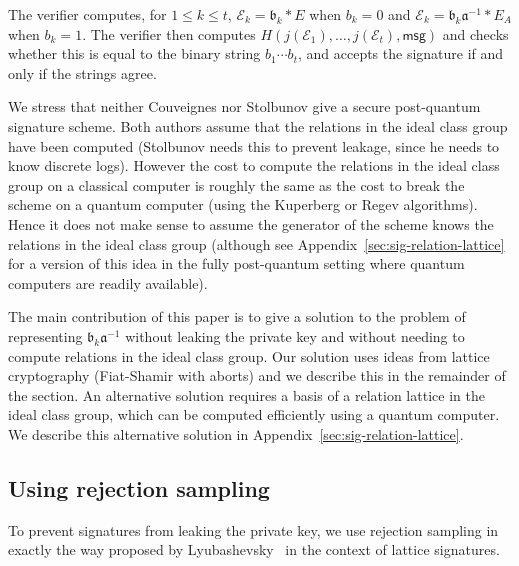 \documentclass{llncs}
\newcommand{\E}{\mathcal{E}}
\newcommand{\msg}{\mathsf{msg}}
\renewcommand{\a}{\mathfrak{a}}
\renewcommand{\b}{\mathfrak{b}}
\begin{document}
The verifier computes, for $1 \le k \le t$, $\E_k = \b_k * E$ when $b_k = 0$ and $\E_k = \b_k \a^{-1} * E_A$ when $b_k = 1$. The verifier then computes $H( j( \E_1), \dots, j(\E_t), \msg )$ and checks whether this is equal to the binary string $b_1\cdots b_t$, and accepts the signature if and only if the strings agree.


We stress that neither Couveignes nor Stolbunov give a secure post-quantum signature scheme.
Both authors assume that the relations in the ideal class group have been computed (Stolbunov needs this to prevent leakage, since he needs to know discrete logs).
However the cost to compute the relations in the ideal class group on a classical computer is roughly the same as the cost to break the scheme on a quantum computer (using the Kuperberg or Regev algorithms).
Hence it does not make sense to assume the generator of the scheme knows the relations in the ideal class group (although see Appendix~\ref{sec:sig-relation-lattice} for a version of this idea in the fully post-quantum setting where quantum computers are readily available).

The main contribution of this paper is to give a solution to the problem of representing $\b_k \a^{-1}$ without leaking the private key and without needing to compute relations in the ideal class group.
Our solution uses ideas from lattice cryptography (Fiat-Shamir with aborts) and we describe this in the remainder of the section.
An alternative solution requires a basis of a relation lattice in the ideal class group, which can be computed efficiently using a quantum computer. We describe this alternative solution in Appendix~\ref{sec:sig-relation-lattice}.





\subsection{Using rejection sampling}\label{sec:sig-reject-sample}

To prevent signatures from leaking the private key, we use rejection sampling in exactly the way proposed by Lyubashevsky~\cite{Lyu09} in the context of lattice signatures.
\end{document}
